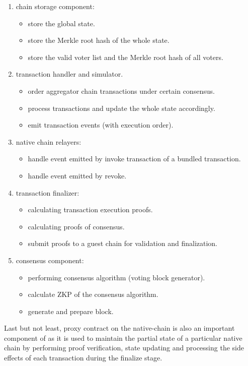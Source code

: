 \documentclass[pageno]{jpaper}
\begin{document}
\begin{enumerate}[leftmargin=*]
\item chain storage component:
    \begin{itemize}
    \item store the global state.
    \item store the Merkle root hash of the whole state.
    \item store the valid voter list and the Merkle root hash of all voters.
    \end{itemize}
\item transaction handler and simulator.
    \begin{itemize}
    \item order aggregator chain transactions under certain consensus.
    \item process transactions and update the whole state accordingly.
    \item emit transaction events (with execution order).
    \end{itemize}
\item native chain relayers:
    \begin{itemize}
    \item handle event emitted by invoke transaction of a bundled transaction.
    \item handle event emitted by revoke.
    \end{itemize}
\item transaction finalizer:
    \begin{itemize}
    \item calculating transaction execution proofs.
    \item calculating proofs of consensus.
    \item submit proofs to a guest chain for validation and finalization.
    \end{itemize}
\item consensus component:
    \begin{itemize}
    \item performing consensus algorithm (voting block generator).
    \item calculate ZKP of the consensus algorithm.
    \item generate and prepare block.
    \end{itemize}
\end{enumerate}

Last but not least, proxy contract on the native-chain is also an important component of \dprotocol as it is used to maintain the partial state of a particular native chain by performing proof verification, state updating and processing the side effects of each transaction during the finalize stage.  
\end{document}
